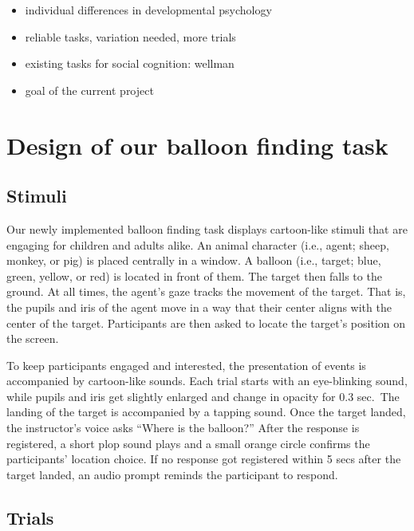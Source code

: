 \documentclass[
  english,
  man,floatsintext]{apa6}
\providecommand{\tightlist}{%
  \setlength{\itemsep}{0pt}\setlength{\parskip}{0pt}}
\begin{document}
\begin{itemize}
\tightlist
\item
  individual differences in developmental psychology
\item
  reliable tasks, variation needed, more trials
\item
  existing tasks for social cognition: wellman
\item
  goal of the current project
\end{itemize}

\hypertarget{design-of-our-balloon-finding-task}{%
\section{Design of our balloon finding task}\label{design-of-our-balloon-finding-task}}

\hypertarget{stimuli}{%
\subsection{Stimuli}\label{stimuli}}

Our newly implemented balloon finding task displays cartoon-like stimuli that are engaging for children and adults alike. An animal character (i.e., agent; sheep, monkey, or pig) is placed centrally in a window. A balloon (i.e., target; blue, green, yellow, or red) is located in front of them. The target then falls to the ground. At all times, the agent's gaze tracks the movement of the target. That is, the pupils and iris of the agent move in a way that their center aligns with the center of the target. Participants are then asked to locate the target's position on the screen.

To keep participants engaged and interested, the presentation of events is accompanied by cartoon-like sounds. Each trial starts with an eye-blinking sound, while pupils and iris get slightly enlarged and change in opacity for 0.3 sec.~The landing of the target is accompanied by a tapping sound. Once the target landed, the instructor's voice asks ``Where is the balloon?'' After the response is registered, a short plop sound plays and a small orange circle confirms the participants' location choice. If no response got registered within 5 secs after the target landed, an audio prompt reminds the participant to respond.

\hypertarget{trials}{%
\subsection{Trials}\label{trials}}
\end{document}
